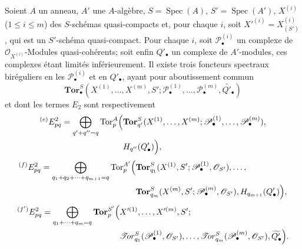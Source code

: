 \begin{corollary}[6.9.4]
Soient $A$ un anneau, $A'$ une $A$-algèbre,
$S=\operatorname{Spec}(A)$, $S'=\operatorname{Spec}(A')$,
$X^{(i)}$ ($1\leq i\leq m$) des $S$-schémas quasi-compacts et, pour chaque
$i$, soit $X'^{(i)}=X_{(S')}^{(i)}$, qui est un $S'$-schéma quasi-compact.
Pour chaque $i$, soit $\mathscr P_\bullet^{(i)}$ un complexe de
$\mathscr O_{X^{(i)}}$-Modules quasi-cohérents; soit enfin $Q'_\bullet$ un
complexe de $A'$-modules, ces complexes étant limités inférieurement. Il
existe trois foncteurs spectraux biréguliers en les
$\mathscr P_\bullet^{(i)}$ et en $Q'_\bullet$, ayant pour aboutissement commun
\[
  \mathbf{Tor}_\bullet^S
  (X^{(1)},\ldots,X^{(m)},S';
   \mathscr P_\bullet^{(1)},\ldots,\mathscr P_\bullet^{(m)},
   \widetilde{Q'_\bullet})
\]
et dont les termes $E_2$ sont respectivement
\[
\begin{split}
  {}^{(e)}E_{pq}^2
  =\bigoplus_{q'+q''=q}
  \operatorname{Tor}_p^A\Bigl(
  &\mathbf{Tor}_{q'}^S
  (X^{(1)},\ldots,X^{(m)};
   \mathscr P_\bullet^{(1)},\ldots,\mathscr P_\bullet^{(m)}),\\
  &H_{q''}(Q'_\bullet)
  \Bigr),
\end{split}
\]
\[
\begin{split}
  {}^{(f)}E_{pq}^2
  =\bigoplus_{q_1+q_2+\cdots+q_{m+1}=q}
  \operatorname{Tor}_p^{A'}\Bigl(
  &\mathbf{Tor}_{q_1}^S
  (X^{(1)},S';\mathscr P_\bullet^{(1)},\mathscr O_{S'}),\ldots,\\
  &\mathbf{Tor}_{q_m}^S
  (X^{(m)},S';\mathscr P_\bullet^{(m)},\mathscr O_{S'}),
  H_{q_{m+1}}(Q'_\bullet)
  \Bigr),
\end{split}
\]
\[
\begin{split}
  {}^{(f')}E_{pq}^2
  =\bigoplus_{q_1+\cdots+q_m=q}
  \mathbf{Tor}_p^{S'}\Bigl(
  &X'^{(1)},\ldots,X'^{(m)},S';\\
  &\mathscr{T}\!or_{q_1}^S
  (\mathscr P_\bullet^{(1)},\mathscr O_{S'}),\ldots,
  \mathscr{T}\!or_{q_m}^S
  (\mathscr P_\bullet^{(m)},\mathscr O_{S'}),
  \widetilde{Q'_\bullet}
  \Bigr).
\end{split}
\]
\end{corollary}

